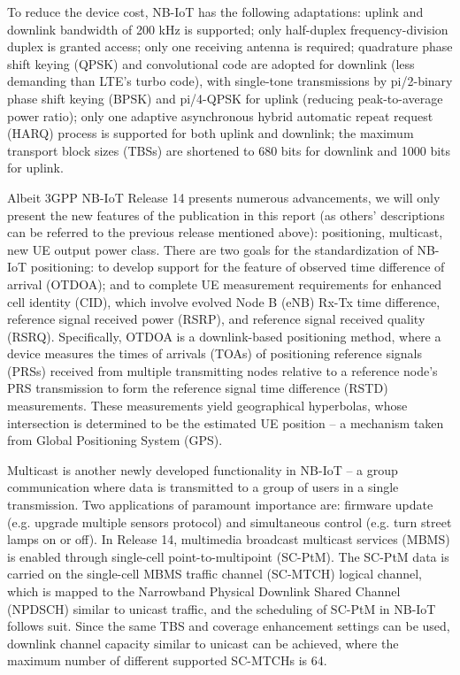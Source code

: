 \documentclass[12pt, a4paper, onside]{article}
\begin{document}
To reduce the device cost, NB-IoT has the following adaptations: uplink and downlink bandwidth of 200 kHz is supported; only half-duplex frequency-division duplex is granted access; only one receiving antenna is required; quadrature phase shift keying (QPSK) and convolutional code are adopted for downlink (less demanding than LTE's turbo code), with single-tone transmissions by pi/2-binary phase shift keying (BPSK) and pi/4-QPSK for uplink (reducing peak-to-average power ratio); only one adaptive asynchronous hybrid automatic repeat request (HARQ) process is supported for both uplink and downlink; the maximum transport block sizes (TBSs) are shortened to 680 bits for downlink and 1000 bits for uplink.

Albeit 3GPP NB-IoT Release 14 presents numerous advancements, we will only present the new features of the publication in this report (as others' descriptions can be referred to the previous release mentioned above): positioning, multicast, new UE output power class. There are two goals for the standardization of NB-IoT positioning: to develop support for the feature of observed time difference of arrival (OTDOA); and to complete UE measurement requirements for enhanced cell identity (CID), which involve evolved Node B (eNB) Rx-Tx time difference, reference signal received power (RSRP), and reference signal received quality (RSRQ). Specifically, OTDOA is a downlink-based positioning method, where a device measures the times of arrivals (TOAs) of positioning reference signals (PRSs) received from multiple transmitting nodes relative to a reference node's PRS transmission to form the reference signal time difference (RSTD) measurements. These measurements yield geographical hyperbolas, whose intersection is determined to be the estimated UE position -- a mechanism taken from Global Positioning System (GPS).

Multicast is another newly developed functionality in NB-IoT -- a group communication where data is transmitted to a group of users in a single transmission. Two applications of paramount importance are: firmware update (e.g. upgrade multiple sensors protocol) and simultaneous control (e.g. turn street lamps on or off). In Release 14, multimedia broadcast multicast services (MBMS) is enabled through single-cell point-to-multipoint (SC-PtM). The SC-PtM data is carried on the single-cell MBMS traffic channel (SC-MTCH) logical channel, which is mapped to the Narrowband Physical Downlink Shared Channel (NPDSCH) similar to unicast traffic, and the scheduling of SC-PtM in NB-IoT follows suit. Since the same TBS and coverage enhancement settings can be used, downlink channel capacity similar to unicast can be achieved, where the maximum number of different supported SC-MTCHs is 64.
\end{document}
